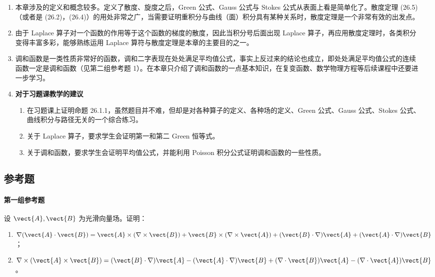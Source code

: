 \begin{enumerate}[label=\arabic*.]
  \item 本章涉及的定义和概念较多。定义了散度、旋度之后，Green 公式、Gauss 公式与 Stokes 公式从表面上看是简单化了。散度定理 (26.5)（或者是 (26.2)，(26.4)）的用处非常之广，当需要证明重积分与曲线（面）积分具有某种关系时，散度定理是一个非常有效的出发点。
  \item 由于 Laplace 算子对一个函数的作用等于这个函数的梯度的散度，因此当积分号后面出现 Laplace 算子，再应用散度定理时，各类积分变得丰富多彩，能够熟练运用 Laplace 算符与散度定理是本章的主要目的之一。
  \item 调和函数是一类性质非常好的函数，调和二字表现在处处满足平均值公式，事实上反过来的结论也成立，即处处满足平均值公式的连续函数一定是调和函数（见第二组参考题 1）。在本章只介绍了调和函数的一点基本知识，在复变函数、数学物理方程等后续课程中还要进一步学习。
  \item \textbf{对于习题课教学的建议}
  \begin{enumerate}[label=(\arabic*)]
    \item 在习题课上证明命题 26.1.1，虽然题目并不难，但却是对各种算子的定义、各种场的定义、Green 公式、Gauss 公式、Stokes 公式、曲线积分与路径无关的一个综合练习。
    \item 关于 Laplace 算子，要求学生会证明第一和第二 Green 恒等式。
    \item 关于调和函数，要求学生会证明平均值公式，并能利用 Poisson 积分公式证明调和函数的一些性质。
  \end{enumerate}
\end{enumerate}

\subsection{参考题}

\paragraph{第一组参考题}

\begin{xreferenceproblem}[1]
设 $\vect{A},\vect{B}$ 为光滑向量场。证明：
\begin{enumerate}[label=(\arabic*)]
  \item $\nabla(\vect{A}\cdot\vect{B})=\vect{A}\times(\nabla\times\vect{B})+\vect{B}\times(\nabla\times\vect{A})+(\vect{B}\cdot\nabla)\vect{A}+(\vect{A}\cdot\nabla)\vect{B}$；
  \item $\nabla\times(\vect{A}\times\vect{B})=(\vect{B}\cdot\nabla)\vect{A}-(\vect{A}\cdot\nabla)\vect{B}+(\nabla\cdot\vect{B})\vect{A}-(\nabla\cdot\vect{A})\vect{B}$。
\end{enumerate}
\end{xreferenceproblem}

